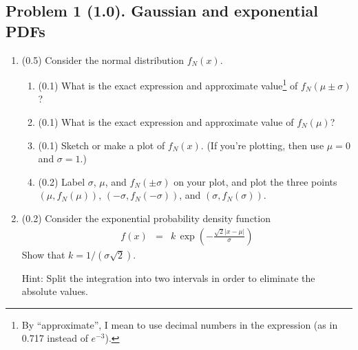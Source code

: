 \documentclass[11pt,titlepage,fleqn]{article}
\begin{document}

\subsection*{Problem 1 (1.0). Gaussian and exponential PDFs}


\begin{enumerate}

\item (0.5) Consider the normal distribution $f_N(x)$.
\begin{enumerate}
\item (0.1) What is the exact expression and approximate value\footnote{By ``approximate'', I mean to use decimal numbers in the expression (as in 0.717 instead of $e^{-3}$).} of $f_N(\mu\pm\sigma)$?
\item (0.1) What is the exact expression and approximate value of $f_N(\mu)$?
\item (0.1) Sketch or make a plot of $f_N(x)$. (If you're plotting, then use $\mu = 0$ and $\sigma = 1$.)
\item (0.2) Label $\sigma$, $\mu$, and $f_N(\pm\sigma)$ on your plot, and plot the three points $(\mu,f_N(\mu))$, $(-\sigma,f_N(-\sigma))$, and $(\sigma,f_N(\sigma))$.
\end{enumerate}


\item (0.2) Consider the exponential probability density function
%
\begin{eqnarray}
f(x) &=& k\,\exp\left(-\frac{\sqrt{2}|x - \mu|}{\sigma} \right)
\end{eqnarray}
%
Show that $k = 1/(\sigma\sqrt{2})$.

Hint: Split the integration into two intervals in order to eliminate the absolute values.



\end{enumerate}
\end{document}
